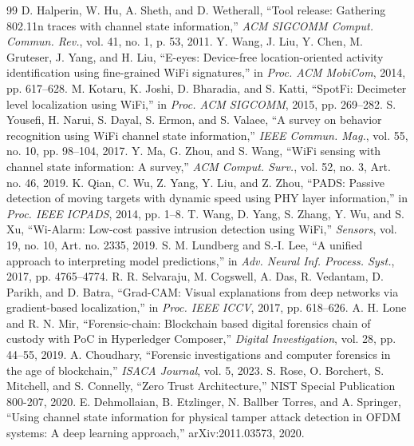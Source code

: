 \documentclass[conference]{IEEEtran}
\begin{document}
\begin{thebibliography}{99}
 D. Halperin, W. Hu, A. Sheth, and D. Wetherall, ``Tool release: Gathering 802.11n traces with channel state information,'' \emph{ACM SIGCOMM Comput. Commun. Rev.}, vol. 41, no. 1, p. 53, 2011.
 Y. Wang, J. Liu, Y. Chen, M. Gruteser, J. Yang, and H. Liu, ``E-eyes: Device-free location-oriented activity identification using fine-grained WiFi signatures,'' in \emph{Proc. ACM MobiCom}, 2014, pp. 617--628.
 M. Kotaru, K. Joshi, D. Bharadia, and S. Katti, ``SpotFi: Decimeter level localization using WiFi,'' in \emph{Proc. ACM SIGCOMM}, 2015, pp. 269--282.
 S. Yousefi, H. Narui, S. Dayal, S. Ermon, and S. Valaee, ``A survey on behavior recognition using WiFi channel state information,'' \emph{IEEE Commun. Mag.}, vol. 55, no. 10, pp. 98--104, 2017.
 Y. Ma, G. Zhou, and S. Wang, ``WiFi sensing with channel state information: A survey,'' \emph{ACM Comput. Surv.}, vol. 52, no. 3, Art. no. 46, 2019.
 K. Qian, C. Wu, Z. Yang, Y. Liu, and Z. Zhou, ``PADS: Passive detection of moving targets with dynamic speed using PHY layer information,'' in \emph{Proc. IEEE ICPADS}, 2014, pp. 1--8.
 T. Wang, D. Yang, S. Zhang, Y. Wu, and S. Xu, ``Wi-Alarm: Low-cost passive intrusion detection using WiFi,'' \emph{Sensors}, vol. 19, no. 10, Art. no. 2335, 2019.
 S. M. Lundberg and S.-I. Lee, ``A unified approach to interpreting model predictions,'' in \emph{Adv. Neural Inf. Process. Syst.}, 2017, pp. 4765--4774.
 R. R. Selvaraju, M. Cogswell, A. Das, R. Vedantam, D. Parikh, and D. Batra, ``Grad-CAM: Visual explanations from deep networks via gradient-based localization,'' in \emph{Proc. IEEE ICCV}, 2017, pp. 618--626.
 A. H. Lone and R. N. Mir, ``Forensic-chain: Blockchain based digital forensics chain of custody with PoC in Hyperledger Composer,'' \emph{Digital Investigation}, vol. 28, pp. 44--55, 2019.
 A. Choudhary, ``Forensic investigations and computer forensics in the age of blockchain,'' \emph{ISACA Journal}, vol. 5, 2023. %
 S. Rose, O. Borchert, S. Mitchell, and S. Connelly, ``Zero Trust Architecture,'' NIST Special Publication 800-207, 2020.
 E. Dehmollaian, B. Etzlinger, N. Ballber Torres, and A. Springer, ``Using channel state information for physical tamper attack detection in OFDM systems: A deep learning approach,'' arXiv:2011.03573, 2020.

\end{thebibliography}
\end{document}
